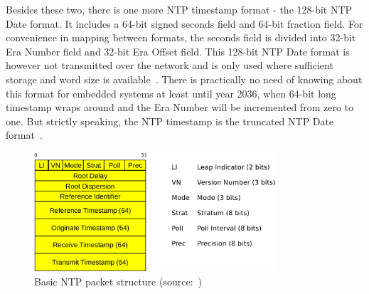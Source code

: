 Besides these two, there is one more NTP timestamp format - the 128-bit NTP Date format.
It includes a 64-bit signed seconds field and 64-bit fraction field.
For convenience in mapping between formats,
the seconds field is divided into 32-bit Era Number field
and 32-bit Era Offset field.
This 128-bit NTP Date format is however not transmitted over the network
and is only used where sufficient storage and word size is available~\cite{rfc5905}.
There is practically no need of knowing about this format for embedded systems
at least until year 2036, when 64-bit long timestamp wraps around and
the Era Number will be incremented from zero to one.
But strictly speaking, the NTP timestamp is the truncated NTP Date format~\cite{rfc5905}.

\begin{figure}
	\centering
	\includegraphics[width=9cm,keepaspectratio]{fig/ntp-packet.pdf}
	\caption{Basic NTP packet structure (source:~\cite{ntp-arch})}
	\label{fig:ntp-packet}
	\bigskip
\end{figure}

